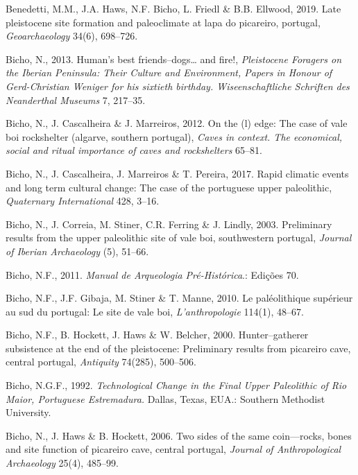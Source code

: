 \documentclass[12pt,twoside]{reedthesis}
\begin{document}
\leavevmode\hypertarget{ref-benedettietal2019}{}%
Benedetti, M.M., J.A. Haws, N.F. Bicho, L. Friedl \& B.B. Ellwood, 2019. Late pleistocene site formation and paleoclimate at lapa do picareiro, portugal, \emph{Geoarchaeology} 34(6), 698--726.

\leavevmode\hypertarget{ref-bicho2013}{}%
Bicho, N., 2013. Human's best friends--dogs\ldots{} and fire!, \emph{Pleistocene Foragers on the Iberian Peninsula: Their Culture and Environment, Papers in Honour of Gerd-Christian Weniger for his sixtieth birthday. Wiseenschaftliche Schriften des Neanderthal Museums} 7, 217--35.

\leavevmode\hypertarget{ref-bichoetal2012}{}%
Bicho, N., J. Cascalheira \& J. Marreiros, 2012. On the (l) edge: The case of vale boi rockshelter (algarve, southern portugal), \emph{Caves in context. The economical, social and ritual importance of caves and rockshelters} 65--81.

\leavevmode\hypertarget{ref-bichoetal2017}{}%
Bicho, N., J. Cascalheira, J. Marreiros \& T. Pereira, 2017. Rapid climatic events and long term cultural change: The case of the portuguese upper paleolithic, \emph{Quaternary International} 428, 3--16.

\leavevmode\hypertarget{ref-bicho2003}{}%
Bicho, N., J. Correia, M. Stiner, C.R. Ferring \& J. Lindly, 2003. Preliminary results from the upper paleolithic site of vale boi, southwestern portugal, \emph{Journal of Iberian Archaeology} (5), 51--66.

\leavevmode\hypertarget{ref-bicho2011}{}%
Bicho, N.F., 2011. \emph{Manual de Arqueologia Pré-Histórica}.: Edições 70.

\leavevmode\hypertarget{ref-bichoetal2010}{}%
Bicho, N.F., J.F. Gibaja, M. Stiner \& T. Manne, 2010. Le paléolithique supérieur au sud du portugal: Le site de vale boi, \emph{L'anthropologie} 114(1), 48--67.

\leavevmode\hypertarget{ref-bichoetal2000}{}%
Bicho, N.F., B. Hockett, J. Haws \& W. Belcher, 2000. Hunter--gatherer subsistence at the end of the pleistocene: Preliminary results from picareiro cave, central portugal, \emph{Antiquity} 74(285), 500--506.

\leavevmode\hypertarget{ref-bicho1992}{}%
Bicho, N.G.F., 1992. \emph{Technological Change in the Final Upper Paleolithic of Rio Maior, Portuguese Estremadura.} Dallas, Texas, EUA.: Southern Methodist University.

\leavevmode\hypertarget{ref-bicho2006}{}%
Bicho, N., J. Haws \& B. Hockett, 2006. Two sides of the same coin---rocks, bones and site function of picareiro cave, central portugal, \emph{Journal of Anthropological Archaeology} 25(4), 485--99.
\end{document}
